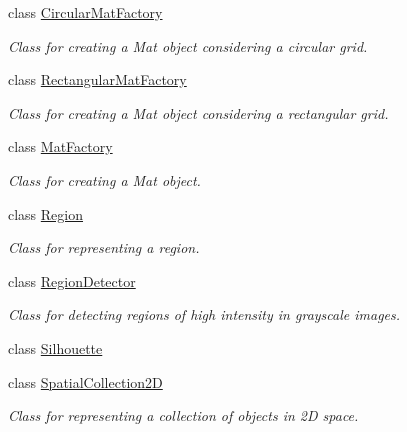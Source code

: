 \begin{DoxyCompactItemize}
class \hyperlink{classmultiscale_1_1analysis_1_1CircularMatFactory}{Circular\-Mat\-Factory}
\begin{DoxyCompactList}\small\item\em Class for creating a Mat object considering a circular grid. \end{DoxyCompactList}\item 
class \hyperlink{classmultiscale_1_1analysis_1_1RectangularMatFactory}{Rectangular\-Mat\-Factory}
\begin{DoxyCompactList}\small\item\em Class for creating a Mat object considering a rectangular grid. \end{DoxyCompactList}\item 
class \hyperlink{classmultiscale_1_1analysis_1_1MatFactory}{Mat\-Factory}
\begin{DoxyCompactList}\small\item\em Class for creating a Mat object. \end{DoxyCompactList}\item 
class \hyperlink{classmultiscale_1_1analysis_1_1Region}{Region}
\begin{DoxyCompactList}\small\item\em Class for representing a region. \end{DoxyCompactList}\item 
class \hyperlink{classmultiscale_1_1analysis_1_1RegionDetector}{Region\-Detector}
\begin{DoxyCompactList}\small\item\em Class for detecting regions of high intensity in grayscale images. \end{DoxyCompactList}\item 
class \hyperlink{classmultiscale_1_1analysis_1_1Silhouette}{Silhouette}
\item 
class \hyperlink{classmultiscale_1_1analysis_1_1SpatialCollection2D}{Spatial\-Collection2\-D}
\begin{DoxyCompactList}\small\item\em Class for representing a collection of objects in 2\-D space. \end{DoxyCompactList}\end{DoxyCompactItemize}
